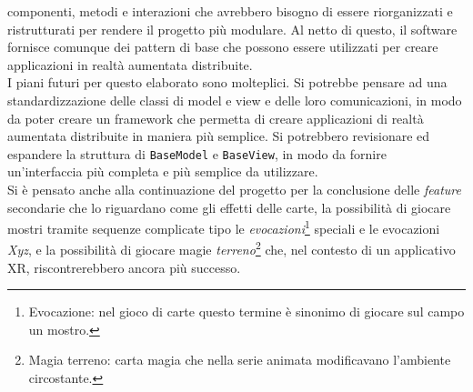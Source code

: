 componenti, metodi e interazioni che avrebbero bisogno di essere riorganizzati e ristrutturati per rendere il progetto più modulare. Al netto di questo, il software fornisce comunque
dei pattern di base che possono essere utilizzati per creare applicazioni in realtà aumentata distribuite.\\
\newline
I piani futuri per questo elaborato sono molteplici. Si potrebbe pensare ad una standardizzazione delle classi di model e view e delle loro comunicazioni, in modo da poter creare
un framework che permetta di creare applicazioni di realtà aumentata distribuite in maniera più semplice. Si potrebbero revisionare ed espandere la struttura di \texttt{BaseModel} e
\texttt{BaseView}, in modo da fornire un'interfaccia più completa e più semplice da utilizzare.\\
Si è pensato anche alla continuazione del progetto per la conclusione delle \textit{feature} secondarie che lo riguardano come gli effetti delle carte, la possibilità di giocare
mostri tramite sequenze complicate tipo le \textit{evocazioni}\footnote{Evocazione: nel gioco di carte questo termine è sinonimo di giocare sul campo un mostro.} speciali e le evocazioni 
\textit{Xyz}, e la possibilità di giocare magie \textit{terreno}\footnote{Magia terreno: carta magia che nella serie animata modificavano l'ambiente circostante.} che, nel contesto di
un applicativo XR, riscontrerebbero ancora più successo.\\